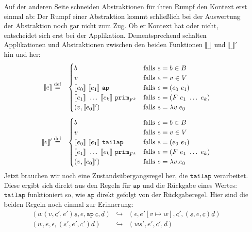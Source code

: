 Auf der anderen Seite schneiden Abstraktionen für ihren Rumpf den
Kontext erst einmal ab: Der Rumpf einer Abstraktion kommt schließlich bei der
Auswertung der Abstraktion noch gar nicht zum Zug.  Ob er Kontext hat
oder nicht, entscheidet sich erst bei der Applikation.
Dementsprechend schalten Applikationen und Abstraktionen zwischen den
beiden Funktionen $\llbracket \underline{~} \rrbracket$ und
$\llbracket \underline{~} \rrbracket'$ hin und her:
%
\begin{eqnarray*}
  \llbracket e \rrbracket &\stackrel{\rm def}{=}&
  \begin{cases}
    b & \textrm{falls $e = b \in B$}\\
    v & \textrm{falls $e = v \in V$}\\
    \llbracket e_0\rrbracket~\llbracket e_1\rrbracket~\mathtt{ap}
    & \textrm{falls $e = (e_0~e_1)$}\\
    \llbracket e_1\rrbracket~\ldots~\llbracket e_k\rrbracket~\mathtt{prim}_{F^k}
    & \textrm{falls $e = (F~e_1~\ldots~e_k)$}\\
    (v, \llbracket e_0\rrbracket') & \textrm{falls $e = \lambda v.e_0$}
  \end{cases}\\[1ex]
  \llbracket e \rrbracket' &\stackrel{\rm def}{=}&
  \begin{cases}
    b & \textrm{falls $e = b \in B$}\\
    v & \textrm{falls $e = v \in V$}\\
    \llbracket e_0\rrbracket~\llbracket e_1\rrbracket~\mathtt{tailap}
    & \textrm{falls $e = (e_0~e_1)$}\\
    \llbracket e_1\rrbracket~\ldots~\llbracket e_k\rrbracket~\mathtt{prim}_{F^k}
    & \textrm{falls $e = (F~e_1~\ldots~e_k)$}\\
    (v, \llbracket e_0\rrbracket') & \textrm{falls $e = \lambda v.e_0$}
  \end{cases}
\end{eqnarray*}
%
Jetzt brauchen wir
noch eine Zustandsübergangsregel her, die $\mathtt{tailap}$
verarbeitet.  Diese ergibt sich direkt aus den Regeln für
$\mathtt{ap}$ und die Rückgabe eines Wertes:  $\mathtt{tailap}$
funktioniert so, wie $\mathtt{ap}$ direkt gefolgt von der
Rückgaberegel.  Hier sind die beiden Regeln noch einmal zur Erinnerung:
%
\begin{eqnarray*}
   (w (v,\underline{c'}, e') \underline{s}, e, \mathtt{ap}~\underline{c}, \underline{d})
  &\hookrightarrow&
  (\epsilon, e'[v\mapsto w], \underline{c'}, (\underline{s}, e, \underline{c}) \underline{d})
  \\
  (w, e, \epsilon, (\underline{s'}, e', \underline{c'}) \underline{d})
  &\hookrightarrow&
  (w\underline{s'}, e', \underline{c'}, \underline{d})
\end{eqnarray*}
